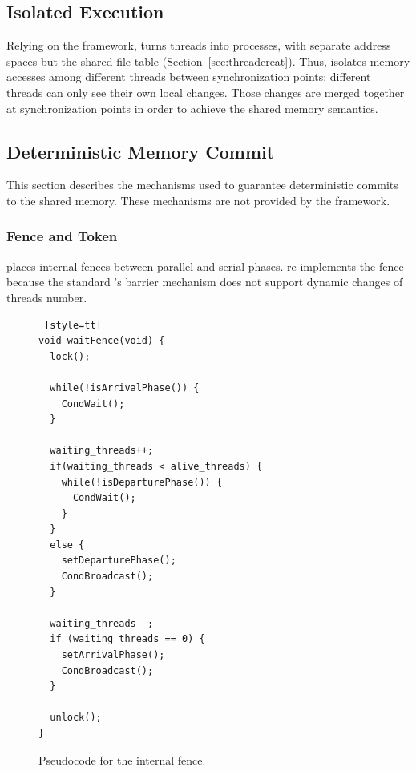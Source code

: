 \subsection{Isolated Execution}
\label{sec:threadsasprocs}

Relying on the \sheriff{} framework, \dthreads{} turns threads into processes, with separate address spaces but the shared file table (Section~\ref{sec:threadcreat}). Thus, \dthreads{} isolates memory accesses among different threads between synchronization points: different threads can only see their own local changes. Those changes are merged together at synchronization points in order to achieve the shared memory semantics. 

\subsection{Deterministic Memory Commit}
\label{sec:sharedmem}

This section describes the mechanisms used to guarantee deterministic commits to the shared memory. These mechanisms are not provided by the \sheriff{} framework.   

\subsubsection{Fence and Token}
\label{sec:schedule}

\dthreads{} places internal fences between parallel and serial phases. \dthreads{} re-implements the fence because the standard \pthreads{}'s barrier mechanism does not support dynamic changes of threads number. 

\begin{figure}
\begin{lstlisting} [style=tt]
void waitFence(void) {
  lock();
	
  while(!isArrivalPhase()) { 
    CondWait();
  }

  waiting_threads++;
  if(waiting_threads < alive_threads) {
    while(!isDeparturePhase()) {
      CondWait();
    }
  } 
  else {
    setDeparturePhase();
    CondBroadcast();
  }

  waiting_threads--;
  if (waiting_threads == 0) {
    setArrivalPhase();
    CondBroadcast();
  }

  unlock();
}

\end{lstlisting}
\caption{Pseudocode for the internal fence.\label{fig:internalFence}}
\end{figure}

